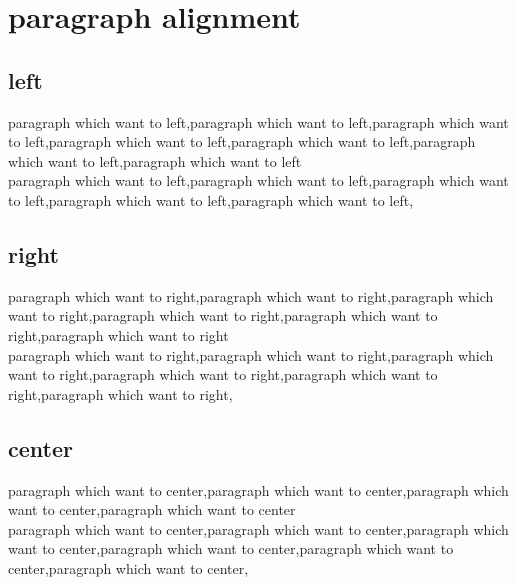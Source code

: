 \documentclass{article}
\begin{document}

\newpage
\section{paragraph alignment}

\subsection{left}
\begin{flushleft}
paragraph which want to left,paragraph which want to left,paragraph which want to left,paragraph which want to left,paragraph which want to left,paragraph which want to left,paragraph which want to left\\paragraph which want to left,paragraph which want to left,paragraph which want to left,paragraph which want to left,paragraph which want to left,
\end{flushleft}

\subsection{right}
\begin{flushright}
paragraph which want to right,paragraph which want to right,paragraph which want to right,paragraph which want to right,paragraph which want to right,paragraph which want to right\\paragraph which want to right,paragraph which want to right,paragraph which want to right,paragraph which want to right,paragraph which want to right,paragraph which want to right,
\end{flushright}

\subsection{center}
\begin{center}
paragraph which want to center,paragraph which want to center,paragraph which want to center,paragraph which want to center\\paragraph which want to center,paragraph which want to center,paragraph which want to center,paragraph which want to center,paragraph which want to center,paragraph which want to center,
\end{center}
\end{document}
